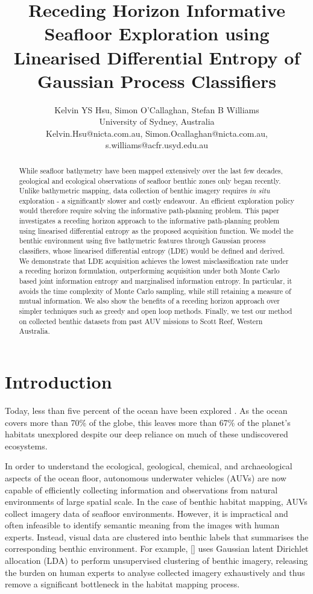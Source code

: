 \documentclass{article}
\title{Receding Horizon Informative Seafloor Exploration using Linearised Differential Entropy of Gaussian Process Classifiers}
\author{Kelvin YS Hsu, Simon O'Callaghan, Stefan B Williams \\ University of Sydney, Australia \\ 
Kelvin.Hsu@nicta.com.au, Simon.Ocallaghan@nicta.com.au, s.williams@acfr.usyd.edu.au}
\newcommand{\incite}[1]{\citeauthor{#1} [\citeyear{#1}]}
\begin{document}
\maketitle

\begin{abstract}
	While seafloor bathymetry have been mapped extensively over the last few decades, geological and ecological observations of seafloor benthic zones only began recently. Unlike bathymetric mapping, data collection of benthic imagery requires \textit{in situ} exploration - a significantly slower and costly endeavour. An efficient exploration policy would therefore require solving the informative path-planning problem. This paper investigates a receding horizon approach to the informative path-planning problem using linearised differential entropy as the proposed acquisition function. We model the benthic environment using five bathymetric features through Gaussian process classifiers, whose linearised differential entropy (LDE) would be defined and derived. We demonstrate that LDE acquisition achieves the lowest misclassification rate under a receding horizon formulation, outperforming acquisition under both Monte Carlo based joint information entropy and marginalised information entropy. In particular, it avoids the time complexity of Monte Carlo sampling, while still retaining a measure of mutual information. We also show the benefits of a receding horizon approach over simpler techniques such as greedy and open loop methods. Finally, we test our method on collected benthic datasets from past AUV missions to Scott Reef, Western Australia.
\end{abstract}

\section{Introduction}
\label{Section:Introduction}

	Today, less than five percent of the ocean have been explored \cite{NOAA}. As the ocean covers more than 70\% of the globe, this leaves more than 67\% of the planet's habitats unexplored despite our deep reliance on much of these undiscovered ecosystems.
	
	In order to understand the ecological, geological, chemical, and archaeological aspects of the ocean floor, autonomous underwater vehicles (AUVs) are now capable of efficiently collecting information and observations from natural environments of large spatial scale. In the case of benthic habitat mapping, AUVs collect imagery data of seafloor environments. However, it is impractical and often infeasible to identify semantic meaning from the images with human experts. Instead, visual data are clustered into benthic labels that summarises the corresponding benthic environment. For example, \incite{Steinberg2015128} uses Gaussian latent Dirichlet allocation (LDA) to perform unsupervised clustering of benthic imagery, releasing the burden on human experts to analyse collected imagery exhaustively and thus remove a significant bottleneck in the habitat mapping process.
\end{document}

